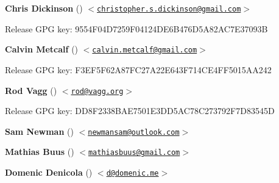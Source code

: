 \begin{DoxyItemize}
\item {\bfseries Chris Dickinson} (\href{https://github.com/chrisdickinson}{\tt }) $<$\href{mailto:christopher.s.dickinson@gmail.com}{\tt christopher.\+s.\+dickinson@gmail.\+com}$>$
\begin{DoxyItemize}
\item Release G\+PG key\+: 9554\+F04\+D7259\+F04124\+D\+E6\+B476\+D5\+A82\+A\+C7\+E37093B
\end{DoxyItemize}
\item {\bfseries Calvin Metcalf} (\href{https://github.com/calvinmetcalf}{\tt }) $<$\href{mailto:calvin.metcalf@gmail.com}{\tt calvin.\+metcalf@gmail.\+com}$>$
\begin{DoxyItemize}
\item Release G\+PG key\+: F3\+E\+F5\+F62\+A87\+F\+C27\+A22\+E643\+F714\+C\+E4\+F\+F5015\+A\+A242
\end{DoxyItemize}
\item {\bfseries Rod Vagg} (\href{https://github.com/rvagg}{\tt }) $<$\href{mailto:rod@vagg.org}{\tt rod@vagg.\+org}$>$
\begin{DoxyItemize}
\item Release G\+PG key\+: D\+D8\+F2338\+B\+A\+E7501\+E3\+D\+D5\+A\+C78\+C273792\+F7\+D83545D
\end{DoxyItemize}
\item {\bfseries Sam Newman} (\href{https://github.com/sonewman}{\tt }) $<$\href{mailto:newmansam@outlook.com}{\tt newmansam@outlook.\+com}$>$
\item {\bfseries Mathias Buus} (\href{https://github.com/mafintosh}{\tt }) $<$\href{mailto:mathiasbuus@gmail.com}{\tt mathiasbuus@gmail.\+com}$>$
\item {\bfseries Domenic Denicola} (\href{https://github.com/domenic}{\tt }) $<$\href{mailto:d@domenic.me}{\tt d@domenic.\+me}$>$ 
\end{DoxyItemize}